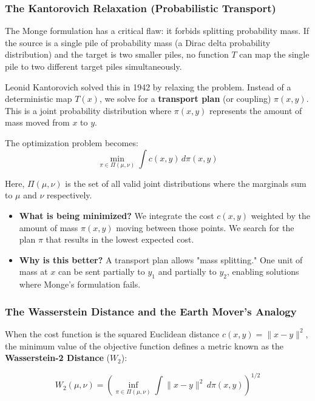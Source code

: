 \documentclass{book}
\begin{document}
\subsubsection{The Kantorovich Relaxation (Probabilistic Transport)}
The Monge formulation has a critical flaw: it forbids splitting probability mass. If the source is a single pile of probability mass (a Dirac delta probability distribution) and the target is two smaller piles, no function $T$ can map the single pile to two different target piles simultaneously.

Leonid Kantorovich solved this in 1942 \cite{kantorovich1942translocation} by relaxing the problem. Instead of a deterministic map $T(x)$, we solve for a \textbf{transport plan} (or coupling) $\pi(x, y)$. This is a joint probability distribution where $\pi(x, y)$ represents the amount of mass moved from $x$ to $y$.

The optimization problem becomes:
\begin{equation}
\min_{\pi \in \Pi(\mu, \nu)} \int c(x, y) \, d\pi(x, y)
\end{equation}

Here, $\Pi(\mu, \nu)$ is the set of all valid joint distributions where the marginals sum to $\mu$ and $\nu$ respectively.
\begin{itemize}
    \item \textbf{What is being minimized?} We integrate the cost $c(x, y)$ weighted by the amount of mass $\pi(x, y)$ moving between those points. We search for the plan $\pi$ that results in the lowest expected cost.
    \item \textbf{Why is this better?} A transport plan allows "mass splitting." One unit of mass at $x$ can be sent partially to $y_1$ and partially to $y_2$, enabling solutions where Monge's formulation fails.
\end{itemize}

\subsubsection{The Wasserstein Distance and the Earth Mover's Analogy}
When the cost function is the squared Euclidean distance $c(x, y) = \|x - y\|^2$, the minimum value of the objective function defines a metric known as the \textbf{Wasserstein-2 Distance} ($W_2$):

\begin{equation}
W_2(\mu, \nu) = \left( \inf_{\pi \in \Pi(\mu, \nu)} \int \|x - y\|^2 \, d\pi(x, y) \right)^{1/2}
\end{equation}
\end{document}
